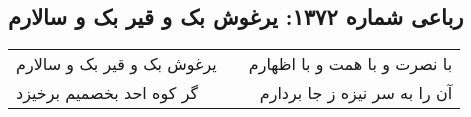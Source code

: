 \begin{center}
\section*{رباعی شماره ۱۳۷۲: یرغوش بک و قیر بک و سالارم}
\label{sec:1372}
\begin{longtable}{l p{0.5cm} r}
یرغوش بک و قیر بک و سالارم
&&
با نصرت و با همت و با اظهارم
\\
گر کوه احد بخصمیم برخیزد
&&
آن را به سر نیزه ز جا بردارم
\\
\end{longtable}
\end{center}
